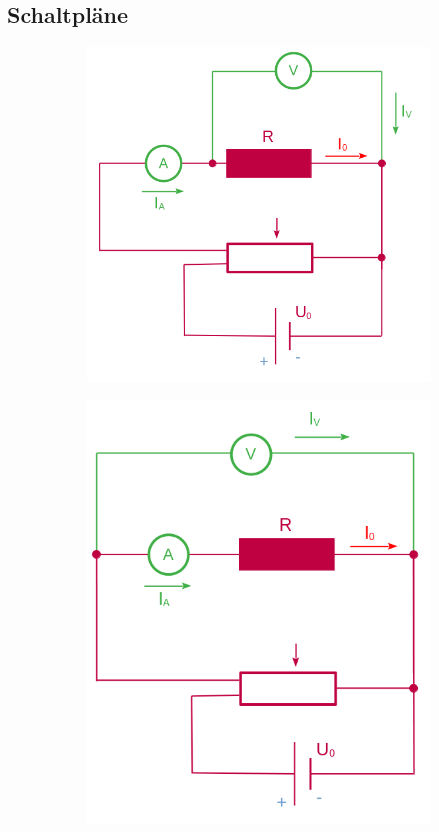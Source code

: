 \documentclass[10pt,a4paper]{article}
\begin{document}
\subsection{Schaltpläne}
\begin{figure}[H]
\centering
\begin{subfigure}[c]{0.5\textwidth}
\vspace{10pt}
\centering
\includegraphics[scale=0.35]{Schaltung_A}
\end{subfigure}%
\begin{subfigure}[c]{0.5\textwidth}
\centering
\includegraphics[scale=0.35]{Schaltung_B}

\end{subfigure}
\end{figure}
\end{document}
